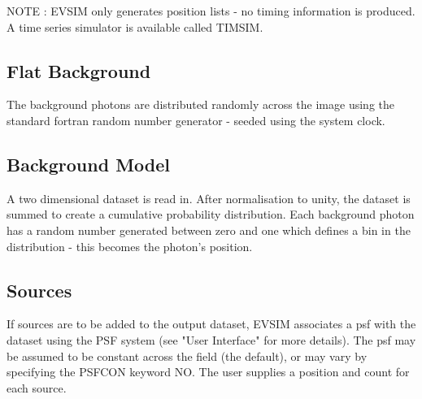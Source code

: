 \documentclass{book}
\renewcommand{\_}{{\tt\char'137}}     %
\begin{document}
NOTE : EVSIM only generates position lists - no timing information
is produced. A time series simulator is available called
TIMSIM.
 
\subsection{Flat Background}
The background photons are distributed randomly across the image
using the standard fortran random number generator - seeded using
the system clock.
 
\subsection{Background Model}
A two dimensional dataset is read in. After normalisation to unity,
the dataset is summed to create a cumulative probability distribution.
Each background photon has a random number generated between zero
and one which defines a bin in the distribution - this becomes the
photon's position.
 
\subsection{Sources}
If sources are to be added to the output dataset, EVSIM associates
a psf with the dataset using the PSF system (see "User Interface" for
more details). The psf may be assumed to be constant across the
field (the default), or may vary by specifying the PSFCON keyword
NO. The user supplies a position and count for each source.
 
\end{document}

